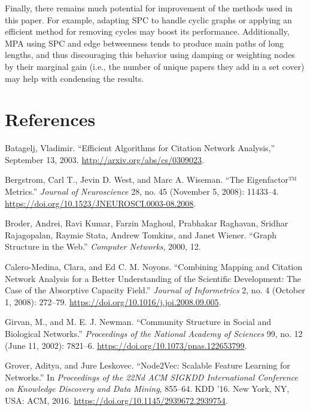\documentclass[lettepaper,]{article}
\begin{document}
Finally, there remains much potential for improvement of the methods
used in this paper. For example, adapting SPC to handle cyclic graphs or
applying an efficient method for removing cycles may boost its
performance. Additionally, MPA using SPC and edge betweenness tends to
produce main paths of long lengths, and thus discouraging this behavior
using damping or weighting nodes by their marginal gain (i.e., the
number of unique papers they add in a set cover) may help with
condensing the results.

\hypertarget{references}{%
\section{References}\label{references}}

\hypertarget{refs}{}
\leavevmode\hypertarget{ref-batageljEfficientAlgorithmsCitation2003}{}%
Batagelj, Vladimir. ``Efficient Algorithms for Citation Network
Analysis,'' September 13, 2003. \url{http://arxiv.org/abs/cs/0309023}.

\leavevmode\hypertarget{ref-bergstromEigenfactorMetrics2008}{}%
Bergstrom, Carl T., Jevin D. West, and Marc A. Wiseman. ``The
Eigenfactor™ Metrics.'' \emph{Journal of Neuroscience} 28, no. 45
(November 5, 2008): 11433--4.
\url{https://doi.org/10.1523/JNEUROSCI.0003-08.2008}.

\leavevmode\hypertarget{ref-broderGraphStructureWeb2000}{}%
Broder, Andrei, Ravi Kumar, Farzin Maghoul, Prabhakar Raghavan, Sridhar
Rajagopalan, Raymie Stata, Andrew Tomkins, and Janet Wiener. ``Graph
Structure in the Web.'' \emph{Computer Networks}, 2000, 12.

\leavevmode\hypertarget{ref-calero-medinaCombiningMappingCitation2008}{}%
Calero-Medina, Clara, and Ed C. M. Noyons. ``Combining Mapping and
Citation Network Analysis for a Better Understanding of the Scientific
Development: The Case of the Absorptive Capacity Field.'' \emph{Journal
of Informetrics} 2, no. 4 (October 1, 2008): 272--79.
\url{https://doi.org/10.1016/j.joi.2008.09.005}.

\leavevmode\hypertarget{ref-girvanCommunityStructureSocial2002}{}%
Girvan, M., and M. E. J. Newman. ``Community Structure in Social and
Biological Networks.'' \emph{Proceedings of the National Academy of
Sciences} 99, no. 12 (June 11, 2002): 7821--6.
\url{https://doi.org/10.1073/pnas.122653799}.

\leavevmode\hypertarget{ref-groverNode2VecScalableFeature2016}{}%
Grover, Aditya, and Jure Leskovec. ``Node2Vec: Scalable Feature Learning
for Networks.'' In \emph{Proceedings of the 22Nd ACM SIGKDD
International Conference on Knowledge Discovery and Data Mining},
855--64. KDD '16. New York, NY, USA: ACM, 2016.
\url{https://doi.org/10.1145/2939672.2939754}.
\end{document}
